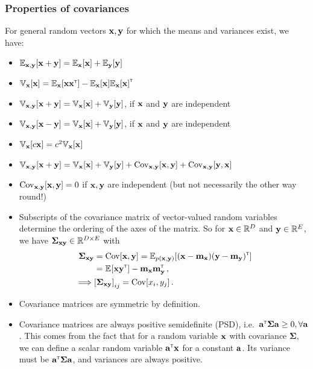\documentclass[a4paper]{article}
\newcommand{\mx}{\vm_\vx}
\newcommand{\my}{\vm_\vy}
\newcommand{\covmat}{\boldsymbol{\Sigma}}
\newcommand{\covxy}{\boldsymbol{\Sigma}_{\vx\vy}}
\theoremstyle{definition}
\begin{document}
\subsubsection{Properties of covariances}
For general random vectors $\mathbf{x},\mathbf{y}$ for which the means and variances exist, we have:
\begin{itemize}
\item $\Exp{\vx,\vy}{\vx + \vy} = \Exp{\vx}{\vx} + \Exp{\vy}{\vy}$
\item $\Var{\vx}{\vx} = \Exp{\vx}{\vx\vx\transpose} - \Exp{\vx}{\vx}\Exp{\vx}{\vx}\transpose$
\item $\Var{\vx,\vy}{\vx + \vy} = \Var{\vx}{\vx} + \Var{\vy}{\vy}$, if $\mathbf{x}$ and $\mathbf{y}$ are independent
\item $\Var{\vx,\vy}{\vx - \vy} = \Var{\vx}{\vx} + \Var{\vy}{\vy}$, if $\mathbf{x}$ and $\mathbf{y}$ are independent
\item $\Var{\vx}{c\vx} = c^2\Var{\vx}{\vx}$
\item $\Var{\vx,\vy}{\vx + \vy} = \Var{\vx}{\vx} + \Var{\vy}{\vy} + \Cov_{\vx, \vy}[\vx, \vy] + \Cov_{\vx, \vy}[\vy, \vx]$
\item $\mathrm{Cov}_{\mathbf{x},\mathbf{y}}[\mathbf{x}, \mathbf{y}] = 0$ if $\mathbf{x}, \mathbf{y}$ are independent (but not necessarily the other way round!)
\item Subscripts of the covariance matrix of vector-valued random variables determine the ordering of the axes of the matrix. So for $\mathbf{x} \in \mathbb{R}^D$ and $\mathbf{y} \in \mathbb{R}^E$, we have $\covxy \in \Reals^{D\times E}$ with
\begin{align}
\covxy &= \Cov[\vx, \vy] = \Exp{p(\vx, \vy)}{(\vx - \mx)(\vy-\my)\transpose} \nonumber \\ 
&= \Exp{}{\vx\vy\transpose} - \mx\my\transpose \,, \\
\implies &\left[\covxy\right]_{ij} = \Cov[x_i, y_j] \,.
\end{align}
\item Covariance matrices are symmetric by definition.
\item Covariance matrices are always positive semidefinite (PSD), i.e.~$\va\transpose\covmat\va \geq 0, \forall \va$. This comes from the fact that for a random variable $\mathbf{x}$ with covariance $\covmat$, we can define a scalar random variable $\mathbf{a}^\mathrm{\textsf{\tiny T}}\mathbf{x}$ for a constant $\mathbf{a}$. Its variance must be $\va\transpose\covmat\va$, and variances are always positive.
\end{itemize}
\end{document}
